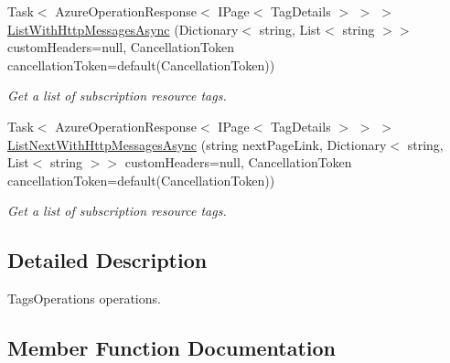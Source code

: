 \begin{DoxyCompactItemize}
Task$<$ Azure\+Operation\+Response$<$ I\+Page$<$ Tag\+Details $>$ $>$ $>$ \hyperlink{interface_microsoft_1_1_azure_1_1_management_1_1_resources_1_1_i_tags_operations_ad2b5bccc8638da0b9964676db6b858e6}{List\+With\+Http\+Messages\+Async} (Dictionary$<$ string, List$<$ string $>$$>$ custom\+Headers=null, Cancellation\+Token cancellation\+Token=default(Cancellation\+Token))
\begin{DoxyCompactList}\small\item\em Get a list of subscription resource tags. \end{DoxyCompactList}\item 
Task$<$ Azure\+Operation\+Response$<$ I\+Page$<$ Tag\+Details $>$ $>$ $>$ \hyperlink{interface_microsoft_1_1_azure_1_1_management_1_1_resources_1_1_i_tags_operations_a2b5f25361f8e34269c9f298e10170b76}{List\+Next\+With\+Http\+Messages\+Async} (string next\+Page\+Link, Dictionary$<$ string, List$<$ string $>$$>$ custom\+Headers=null, Cancellation\+Token cancellation\+Token=default(Cancellation\+Token))
\begin{DoxyCompactList}\small\item\em Get a list of subscription resource tags. \end{DoxyCompactList}\end{DoxyCompactItemize}


\subsection{Detailed Description}
Tags\+Operations operations. 



\subsection{Member Function Documentation}

